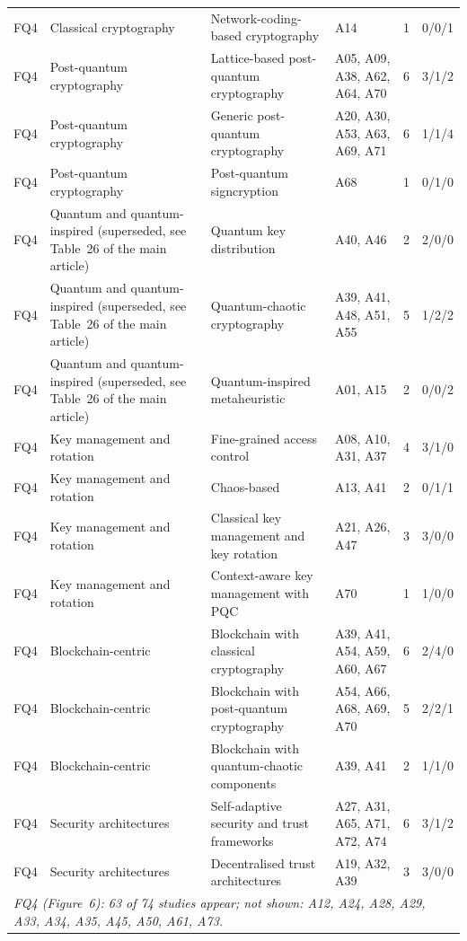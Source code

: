 {\begin{footnotesize}
\begin{longtable}{p{0.63cm}p{2.83cm}p{2.67cm}p{5.19cm}rp{1.26cm}}
FQ4 & Classical cryptography & Network-coding-based cryptography & A14 & 1 & 0/0/1 \\
FQ4 & Post-quantum cryptography & Lattice-based post-quantum cryptography & A05, A09, A38, A62, A64, A70 & 6 & 3/1/2 \\
FQ4 & Post-quantum cryptography & Generic post-quantum cryptography & A20, A30, A53, A63, A69, A71 & 6 & 1/1/4 \\
FQ4 & Post-quantum cryptography & Post-quantum signcryption & A68 & 1 & 0/1/0 \\
FQ4 & Quantum and quantum-inspired (superseded, see Table~26 of the main article) & Quantum key distribution & A40, A46 & 2 & 2/0/0 \\
FQ4 & Quantum and quantum-inspired (superseded, see Table~26 of the main article) & Quantum-chaotic cryptography & A39, A41, A48, A51, A55 & 5 & 1/2/2 \\
FQ4 & Quantum and quantum-inspired (superseded, see Table~26 of the main article) & Quantum-inspired metaheuristic & A01, A15 & 2 & 0/0/2 \\
FQ4 & Key management and rotation & Fine-grained access control & A08, A10, A31, A37 & 4 & 3/1/0 \\
FQ4 & Key management and rotation & Chaos-based & A13, A41 & 2 & 0/1/1 \\
FQ4 & Key management and rotation & Classical key management and key rotation & A21, A26, A47 & 3 & 3/0/0 \\
FQ4 & Key management and rotation & Context-aware key management with PQC & A70 & 1 & 1/0/0 \\
FQ4 & Blockchain-centric & Blockchain with classical cryptography & A39, A41, A54, A59, A60, A67 & 6 & 2/4/0 \\
FQ4 & Blockchain-centric & Blockchain with post-quantum cryptography & A54, A66, A68, A69, A70 & 5 & 2/2/1 \\
FQ4 & Blockchain-centric & Blockchain with quantum-chaotic components & A39, A41 & 2 & 1/1/0 \\
FQ4 & Security architectures & Self-adaptive security and trust frameworks & A27, A31, A65, A71, A72, A74 & 6 & 3/1/2 \\
FQ4 & Security architectures & Decentralised trust architectures & A19, A32, A39 & 3 & 3/0/0 \\
\multicolumn{6}{p{14.2cm}}{\emph{FQ4 (Figure~6): 63 of 74 studies appear; not shown: A12, A24, A28, A29, A33, A34, A35, A45, A50, A61, A73.}}\\ \hline
\end{longtable}
\end{footnotesize}
}
